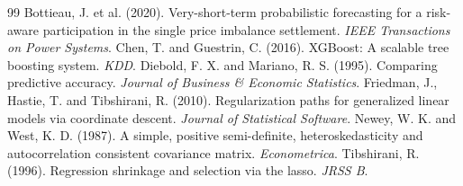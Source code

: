 \documentclass[11pt,a4paper]{article}
\begin{document}
\begin{thebibliography}{99}\small
{} Bottieau, J. et al. (2020). Very-short-term probabilistic forecasting for a risk-aware participation in the single price imbalance settlement. \textit{IEEE Transactions on Power Systems}.
 Chen, T. and Guestrin, C. (2016). XGBoost: A scalable tree boosting system. \textit{KDD}.
 Diebold, F. X. and Mariano, R. S. (1995). Comparing predictive accuracy. \textit{Journal of Business \& Economic Statistics}.
 Friedman, J., Hastie, T. and Tibshirani, R. (2010). Regularization paths for generalized linear models via coordinate descent. \textit{Journal of Statistical Software}.
 Newey, W. K. and West, K. D. (1987). A simple, positive semi-definite, heteroskedasticity and autocorrelation consistent covariance matrix. \textit{Econometrica}.
 Tibshirani, R. (1996). Regression shrinkage and selection via the lasso. \textit{JRSS B}.
\end{thebibliography}
\end{document}

